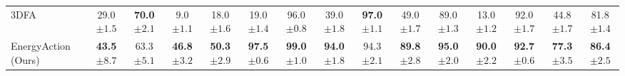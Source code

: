 \begin{table}[ht]
{\begin{tabular}{l|cc|cc|cc|cc|cc|cc|cc}
    3DFA~\cite{gkanatsios20253d} & 29.0\textcolor[gray]{0.5}{\small{$\pm1.5$}} & \textbf{70.0}\textcolor[gray]{0.5}{\small{$\pm2.1$}} & 9.0\textcolor[gray]{0.5}{\small{$\pm1.1$}} & 18.0\textcolor[gray]{0.5}{\small{$\pm1.6$}} & 19.0\textcolor[gray]{0.5}{\small{$\pm1.4$}} & 96.0\textcolor[gray]{0.5}{\small{$\pm0.8$}} & 39.0\textcolor[gray]{0.5}{\small{$\pm1.8$}} & \textbf{97.0}\textcolor[gray]{0.5}{\small{$\pm1.1$}} & 49.0\textcolor[gray]{0.5}{\small{$\pm1.7$}} & 89.0\textcolor[gray]{0.5}{\small{$\pm1.3$}} & 13.0\textcolor[gray]{0.5}{\small{$\pm1.2$}} & 92.0\textcolor[gray]{0.5}{\small{$\pm1.7$}} & 44.8\textcolor[gray]{0.5}{\small{$\pm1.7$}} & 81.8\textcolor[gray]{0.5}{\small{$\pm1.4$}} \\
    \rowcolor[rgb]{.902,.996,1.0}EnergyAction (Ours) & \textbf{43.5}\textcolor[gray]{0.5}{\small{$\pm8.7$}} & 63.3\textcolor[gray]{0.5}{\small{$\pm5.1$}} & \textbf{46.8}\textcolor[gray]{0.5}{\small{$\pm3.2$}} & \textbf{50.3}\textcolor[gray]{0.5}{\small{$\pm2.9$}} & \textbf{97.5}\textcolor[gray]{0.5}{\small{$\pm0.6$}} & \textbf{99.0}\textcolor[gray]{0.5}{\small{$\pm1.0$}} & \textbf{94.0}\textcolor[gray]{0.5}{\small{$\pm1.8$}} & 94.3\textcolor[gray]{0.5}{\small{$\pm2.1$}} & \textbf{89.8}\textcolor[gray]{0.5}{\small{$\pm2.8$}} & \textbf{95.0}\textcolor[gray]{0.5}{\small{$\pm2.0$}} & \textbf{90.0}\textcolor[gray]{0.5}{\small{$\pm2.2$}} & \textbf{92.7}\textcolor[gray]{0.5}{\small{$\pm0.6$}} & \textbf{77.3}\textcolor[gray]{0.5}{\small{$\pm3.5$}} & \textbf{86.4}\textcolor[gray]{0.5}{\small{$\pm2.5$}} \\
    \bottomrule[1pt]
    \end{tabular}
    }%
  \label{tab:simulation_performance}%
\end{table}

